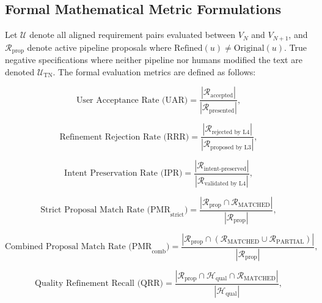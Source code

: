 \documentclass[journal]{IEEEtran}
\begin{document}
\subsection{Formal Mathematical Metric Formulations}
\label{sec:formal-metrics}

Let $\mathcal{U}$ denote all aligned requirement pairs evaluated between $V_N$ and $V_{N+1}$, and $\mathcal{R}_{\text{prop}}$ denote active pipeline proposals where $\text{Refined}(u) \neq \text{Original}(u)$. True negative specifications where neither pipeline nor humans modified the text are denoted $\mathcal{U}_{\text{TN}}$. The formal evaluation metrics are defined as follows:

\begin{equation}
\text{User Acceptance Rate (UAR)} = \frac{|\mathcal{R}_{\text{accepted}}|}{|\mathcal{R}_{\text{presented}}|},
\label{eq:uar}
\end{equation}

\begin{equation}
\text{Refinement Rejection Rate (RRR)} = \frac{|\mathcal{R}_{\text{rejected by L4}}|}{|\mathcal{R}_{\text{proposed by L3}}|},
\label{eq:rrr}
\end{equation}

\begin{equation}
\text{Intent Preservation Rate (IPR)} = \frac{|\mathcal{R}_{\text{intent-preserved}}|}{|\mathcal{R}_{\text{validated by L4}}|},
\label{eq:ipr}
\end{equation}

\begin{equation}
\text{Strict Proposal Match Rate (PMR}_{\text{strict}}\text{)} = \frac{|\mathcal{R}_{\text{prop}} \cap \mathcal{R}_{\text{MATCHED}}|}{|\mathcal{R}_{\text{prop}}|},
\label{eq:strict_match}
\end{equation}

\begin{equation}
\text{Combined Proposal Match Rate (PMR}_{\text{comb}}\text{)} = \frac{|\mathcal{R}_{\text{prop}} \cap (\mathcal{R}_{\text{MATCHED}} \cup \mathcal{R}_{\text{PARTIAL}})|}{|\mathcal{R}_{\text{prop}}|},
\label{eq:comb_match}
\end{equation}

\begin{equation}
\text{Quality Refinement Recall (QRR)} = \frac{|\mathcal{R}_{\text{prop}} \cap \mathcal{H}_{\text{qual}} \cap \mathcal{R}_{\text{MATCHED}}|}{|\mathcal{H}_{\text{qual}}|},
\label{eq:qrr}
\end{equation}
\end{document}
